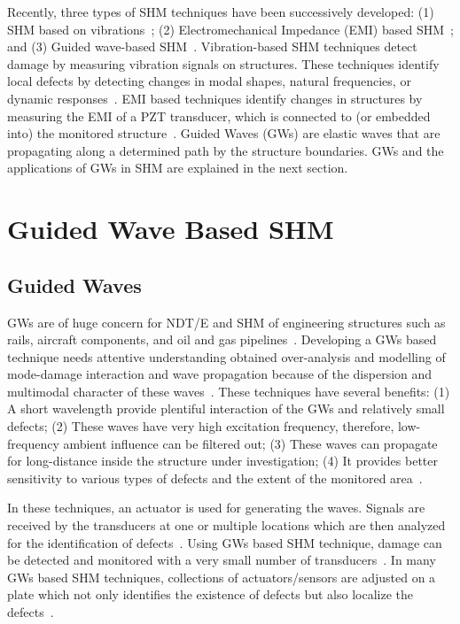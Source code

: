 \documentclass[b5paper, 11pt, titlepage]{book}
\begin{document}
Recently, three types of SHM techniques have been successively developed: (1)  SHM based on vibrations~\cite{deraemaeker2012new, MMaia}; (2) Electromechanical Impedance (EMI) based SHM~\cite{liang1997coupled, Fiborek2018}; and (3) Guided wave-based SHM~\cite{Raghavan2007, Mei2019,Tian2015,Park2014,Sikdar2019,Girolamo2018,Rogge2013,Kudela2018}. Vibration-based SHM techniques detect damage by measuring vibration signals on structures. These techniques identify local defects by detecting changes in modal shapes, natural frequencies, or dynamic responses~\cite{deraemaeker2012new, MMaia}. EMI based techniques identify changes in structures by measuring the EMI of a PZT transducer, which is connected to (or embedded into) the monitored structure~\cite{liang1997coupled, Fiborek2018}. Guided Waves (GWs) are elastic waves that are propagating along a determined path by the structure boundaries. GWs and the applications of GWs in SHM are explained in the next section.

\section{Guided Wave Based SHM}
\subsection{Guided Waves}

GWs are of huge concern for NDT/E and SHM of engineering structures such as rails, aircraft components, and oil and gas pipelines~\cite{rose1998ultrasonic, fromme2006development, wilcox2003guided, gao2009ice}. Developing a GWs based technique needs attentive understanding obtained over-analysis and modelling of mode-damage interaction and wave propagation because of the dispersion and multimodal character of these waves~\cite{Lugovtsova2019}. These techniques have several benefits: (1) A short wavelength provide plentiful interaction of the GWs and relatively small defects; (2) These waves have very high excitation frequency, therefore, low-frequency ambient influence can be filtered out; (3) These waves can propagate for long-distance inside the structure under investigation; (4) It provides better sensitivity to various types of defects and the extent of the monitored area~\cite{Wang2020}.

In these techniques, an actuator is used for generating the waves. Signals are received by the transducers at one or multiple locations which are then analyzed for the identification of defects~\cite{Wang2020}. Using GWs based SHM technique, damage can be detected and monitored with a very small number of transducers~\cite{Mitra2016, Cawley2003, Munian2018}. In many GWs based SHM techniques, collections of actuators/sensors are adjusted on a plate which not only identifies the existence of defects but also localize the defects~\cite{Farrar2012}.
\end{document}
